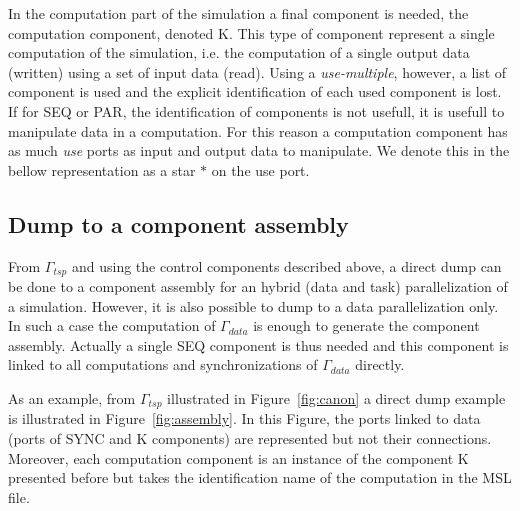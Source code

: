 In the computation part of the simulation a final component is needed, the computation component, denoted K. This type of component represent a single computation of the simulation, i.e. the computation of a single output data (written) using a set of input data (read). Using a \emph{use-multiple}, however, a list of component is used and the explicit identification of each used component is lost. If for SEQ or PAR, the identification of components is not usefull, it is usefull to manipulate data in a computation. For this reason a computation component has as much \emph{use} ports as input and output data to manipulate. We denote this in the bellow representation as a star $*$ on the use port.



\subsection{Dump to a component assembly}
From $\Gamma_{tsp}$ and using the control components described above, a direct dump can be done to a component assembly for an hybrid (data and task) parallelization of a simulation. However, it is also possible to dump to a data parallelization only. In such a case the computation of $\Gamma_{data}$ is enough to generate the component assembly. Actually a single SEQ component is thus needed and this component is linked to all computations and synchronizations of $\Gamma_{data}$ directly.

As an example, from $\Gamma_{tsp}$ illustrated in Figure~\ref{fig:canon} a direct dump example is illustrated in Figure~\ref{fig:assembly}. In this Figure, the ports linked to data (ports of SYNC and K components) are represented but not their connections. Moreover, each computation component is an instance of the component K presented before but takes the identification name of the computation in the MSL file.

